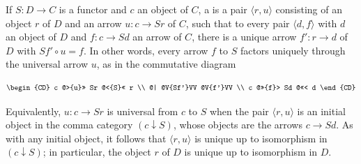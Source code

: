 If $S \colon D \to C$ is a functor and $c$ an object of $C$, a  is a pair $\langle r, u \rangle$ consisting of an object $r$ of $D$ and an arrow $u \colon c \to Sr$ of $C$, such that to every pair $\langle d, f \rangle$ with $d$ an object of $D$ and $f \colon c \to Sd$ an arrow of $C$, there is a unique arrow $f' \colon r \to d$ of $D$ with $Sf' \circ u = f$. In other words, every arrow $f$ to $S$ factors uniquely through the universal arrow $u$, as in the commutative diagram

$$
\begin{CD}
c @>{u}>> Sr @<{S}<< r \\
@| @V{Sf'}VV @V{f'}VV \\
c @>>{f}> Sd @<<< d
\end{CD}
$$

Equivalently, $u \colon c \to Sr$ is universal from $c$ to $S$ when the pair $\langle r, u \rangle$ is an initial object in the comma category $(c \downarrow S)$, whose objects are the arrows $c \to Sd$. As with any initial object, it follows that $\langle r, u \rangle$ is unique up to isomorphism in $(c \downarrow S)$; in particular, the object $r$ of $D$ is unique up to isomorphism in $D$.
